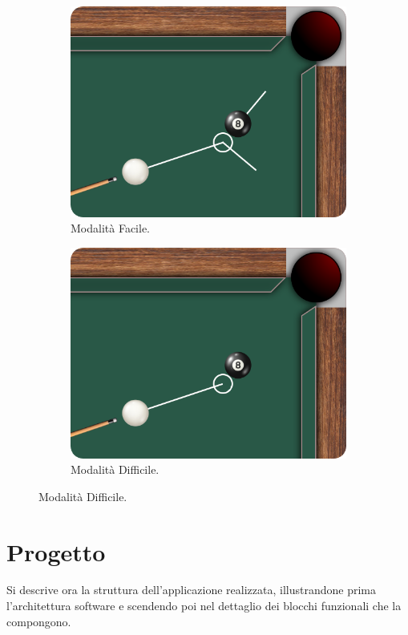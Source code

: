 \documentclass[12pt,a4paper]{report}
\begin{document}
\begin{figure}[h]
\centering
 \begin{subfigure}{.35\textwidth}
    \centering
    \includegraphics[width=.95\linewidth]{Mode1.png}
    \caption{Modalità Facile.}
    \label{fig:easyMode}
 \end{subfigure}
 \begin{subfigure}{.35\textwidth}
    \centering
    \includegraphics[width=.95\linewidth]{Mode2.png}
    \caption{Modalità Difficile.}
    \label{fig:hardMode}
 \end{subfigure}
\end{figure}

\chapter{Progetto} \label{ch:Project} %
Si descrive ora la struttura dell'applicazione realizzata, illustrandone prima l'architettura software e scendendo poi nel dettaglio dei blocchi funzionali che la compongono.
\end{document}
